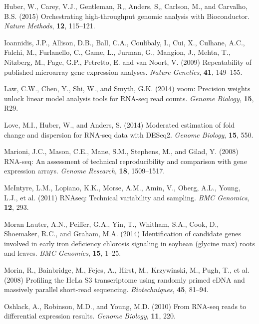 \documentclass{bioinfo}
\begin{document}
\begin{thebibliography}{}
Huber, W., Carey, V.J., Gentleman, R,, Anders, S,, Carlson, M., and Carvalho, B.S. (2015) Orchestrating high-throughput genomic analysis with Bioconductor. {\it Nature Methods}, {\bf 12}, 115--121.

Ioannidis, J.P., Allison, D.B., Ball, C.A., Coulibaly, I., Cui, X., Culhane, A.C., Falchi, M., Furlanello, C., Game, L., Jurman, G., Mangion, J., Mehta, T., Nitzberg, M., Page, G.P., Petretto, E. and van Noort, V. (2009) Repeatability of published microarray gene expression analyses. {\it Nature Genetics}, {\bf 41}, 149--155.

Law, C.W., Chen, Y., Shi, W., and Smyth, G.K. (2014) voom: Precision weights unlock linear model analysis tools for RNA-seq read counts. {\it Genome Biology}, {\bf 15}, R29.

Love, M.I., Huber, W., and Anders, S. (2014) Moderated estimation of fold change and dispersion for RNA-seq data with DESeq2. {\it Genome Biology}, {\bf 15}, 550.

Marioni, J.C., Mason, C.E., Mane, S.M., Stephens, M., and Gilad, Y. (2008) RNA-seq: An assessment of technical reproducibility and comparison with gene expression arrays. {\it Genome Research}, {\bf 18}, 1509--1517.

McIntyre, L.M., Lopiano, K.K., Morse, A.M., Amin, V., Oberg, A.L., Young, L.J., et al. (2011) RNAseq: Technical variability and sampling. {\it BMC Genomics}, {\bf 12}, 293.

Moran Lauter, A.N., Peiffer, G.A., Yin, T., Whitham, S.A., Cook, D., Shoemaker, R.C., and Graham, M.A. (2014) Identification of candidate genes involved in early iron deficiency chlorosis signaling in soybean (glycine max) roots and leaves. {\it BMC Genomics}, {\bf 15}, 1--25.

Morin, R., Bainbridge, M., Fejes, A., Hirst, M., Krzywinski, M., Pugh, T., et al. (2008) Profiling the HeLa S3 transcriptome using randomly primed cDNA and massively parallel short-read sequencing. {\it Biotechniques}, {\bf 45}, 81--94.

Oshlack, A., Robinson, M.D., and Young, M.D. (2010) From RNA-seq reads to differential expression results.
{\it Genome Biology}, {\bf 11}, 220.


\end{thebibliography}
\end{document}
